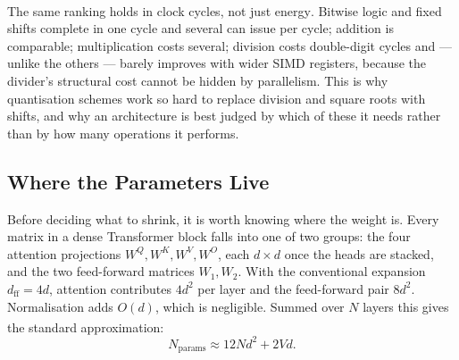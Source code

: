 \begin{engineernote}
The same ranking holds in clock cycles, not just
energy\textsuperscript{\cite{fogInstructionTables2026}}. Bitwise logic and
fixed shifts complete in one cycle and several can issue per cycle; addition is
comparable; multiplication costs several; division costs double-digit cycles
and --- unlike the others --- barely improves with wider SIMD registers, because
the divider's structural cost cannot be hidden by parallelism. This is why
quantisation schemes work so hard to replace division and square roots with
shifts, and why an architecture is best judged by which of these it needs
rather than by how many operations it performs.
\end{engineernote}

\subsection{Where the Parameters Live}

Before deciding what to shrink, it is worth knowing where the weight is. Every
matrix in a dense Transformer block falls into one of two groups: the four
attention projections $W^Q, W^K, W^V, W^O$, each $d\times d$ once the heads are
stacked, and the two feed-forward matrices $W_1, W_2$. With the conventional
expansion $d_{\text{ff}} = 4d$, attention contributes $4d^2$ per layer and the
feed-forward pair $8d^2$. Normalisation adds $O(d)$, which is negligible.
Summed over $N$ layers this gives the standard
approximation\textsuperscript{\cite{kaplanScalingLawsNeural2020}}:
\begin{equation}
  N_{\text{params}} \approx 12Nd^2 + 2Vd .
  \label{eq:dl-parameter-budget}
\end{equation}

